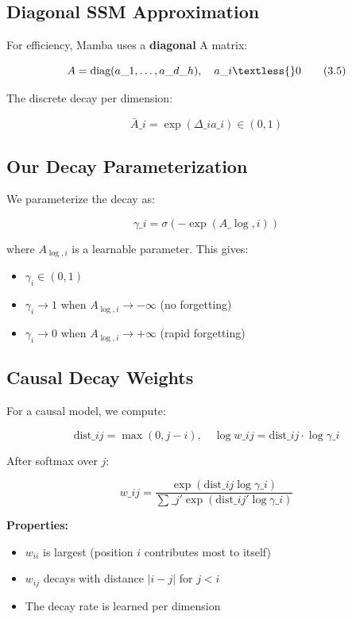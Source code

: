 \subsection{Diagonal SSM Approximation}

For efficiency, Mamba uses a \textbf{diagonal} A matrix:

\[
A = \text{diag}(a\_1, \dots, a\_{d\_h}), \quad a\_i \textless{} 0
\tag{3.5}
\]

The discrete decay per dimension:

\[
\bar{A}\_i = \exp(\Delta\_i a\_i) \in (0, 1)
\tag{3.6}
\]

\subsection{Our Decay Parameterization}

We parameterize the decay as:

\[
\gamma\_i = \sigma(-\exp(A\_{\log, i}))
\tag{3.7}
\]

where $A_{\log, i}$ is a learnable parameter. This gives:

\begin{itemize}
\item $\gamma_i \in (0, 1)$
\item $\gamma_i \to 1$ when $A_{\log, i} \to -\infty$ (no forgetting)
\item $\gamma_i \to 0$ when $A_{\log, i} \to +\infty$ (rapid forgetting)

\end{itemize}
\subsection{Causal Decay Weights}

For a causal model, we compute:

\[
\text{dist}\_{ij} = \max(0, j - i), \quad
\log w\_{ij} = \text{dist}\_{ij} \cdot \log \gamma\_i
\tag{3.8}
\]

After softmax over $j$:

\[
w\_{ij} = \frac{\exp(\text{dist}\_{ij} \log \gamma\_i)}{\sum\_{j'} \exp(\text{dist}\_{ij'} \log \gamma\_i)}
\tag{3.9}
\]

\textbf{Properties:}
\begin{itemize}
\item $w_{ii}$ is largest (position $i$ contributes most to itself)
\item $w_{ij}$ decays with distance $|i - j|$ for $j < i$
\item The decay rate is learned per dimension

\end{itemize}
